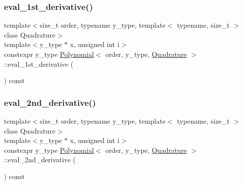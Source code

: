 \mbox{\label{class_polynomial_abd8ecf134802a11d3bd286a778b5772c}} 
\subsubsection{\texorpdfstring{eval\+\_\+1st\+\_\+derivative()}{eval\_1st\_derivative()}}
{\footnotesize\ttfamily template$<$size\+\_\+t order, typename y\+\_\+type, template$<$ typename, size\+\_\+t $>$ class Quadrature$>$ \\
template$<$y\+\_\+type $\ast$ x, unsigned int i$>$ \\
constexpr y\+\_\+type \hyperlink{class_polynomial}{Polynomial}$<$ order, y\+\_\+type, \hyperlink{class_quadrature}{Quadrature} $>$\+::eval\+\_\+1st\+\_\+derivative (\begin{DoxyParamCaption}{ }\end{DoxyParamCaption}) const\hspace{0.3cm}{\ttfamily [inline]}}

\mbox{\label{class_polynomial_a8f135c739984908c26dd9c6dbe045614}} 
\subsubsection{\texorpdfstring{eval\+\_\+2nd\+\_\+derivative()}{eval\_2nd\_derivative()}}
{\footnotesize\ttfamily template$<$size\+\_\+t order, typename y\+\_\+type, template$<$ typename, size\+\_\+t $>$ class Quadrature$>$ \\
template$<$y\+\_\+type $\ast$ x, unsigned int i$>$ \\
constexpr y\+\_\+type \hyperlink{class_polynomial}{Polynomial}$<$ order, y\+\_\+type, \hyperlink{class_quadrature}{Quadrature} $>$\+::eval\+\_\+2nd\+\_\+derivative (\begin{DoxyParamCaption}{ }\end{DoxyParamCaption}) const\hspace{0.3cm}{\ttfamily [inline]}}

\mbox{\label{class_polynomial_a045b1955cf3f6dda4db8b1b50048ab5b}} 
